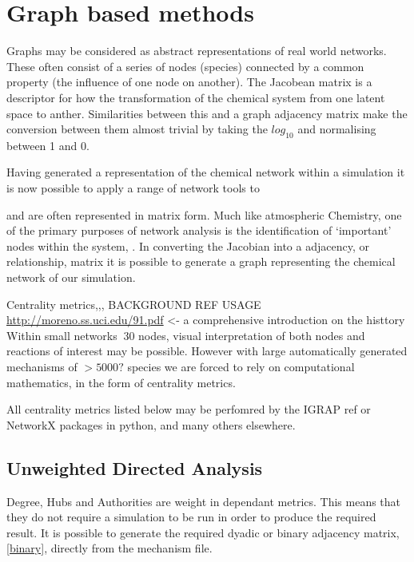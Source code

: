 \documentclass[twoside,reqno]{article}
\begin{document}
\section{Graph based methods}
Graphs may be considered as abstract representations of real world networks. These often consist of a series of nodes (species) connected by a common property (the influence of one node on another). The Jacobean matrix is a descriptor for how the transformation of the chemical system from one latent space to anther. Similarities between this and a graph adjacency matrix make the conversion between them almost trivial by taking the $log_{10}$ and normalising between 1 and 0.

Having generated a representation of the chemical network within a simulation it is now possible to apply a range of network tools to

and are often represented in matrix form. Much like atmospheric Chemistry, one of the primary purposes of network analysis is the identification of `important' nodes within the system, \cite{abstract-realworld}. In converting the Jacobian into a adjacency, or relationship, matrix it is possible to generate a graph representing the chemical network of our simulation.


Centrality metrics,,, BACKGROUND REF USAGE \href{http://moreno.ss.uci.edu/91.pdf}{http://moreno.ss.uci.edu/91.pdf} <- a comprehensive introduction on the histtory  \cite{dev-social-analysis} \\



Within small networks $~ 30$ nodes, visual interpretation of both nodes and reactions of interest may be possible. However with large automatically generated mechanisms of $> 5000?$ species we are forced to rely on computational mathematics, in the form of centrality metrics.

All centrality metrics listed below may be perfomred by the IGRAP ref or NetworkX packages in python, and many others elsewhere.


\subsection{Unweighted Directed Analysis}

Degree, Hubs and Authorities are weight in dependant metrics. This means that they do not require a simulation to be run in order to produce the required result. It is possible to generate the required dyadic or binary adjacency matrix, \autoref{binary}, directly from the mechanism file.
\end{document}
